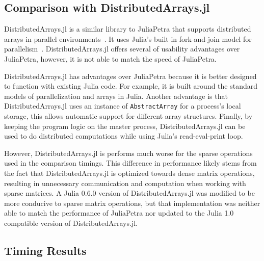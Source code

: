 \documentclass[acmsmall]{acmart}
\newcommand{\snippet}[1]{\lstinline[mathescape]{#1}}
\begin{document}
	\subsection{Comparison with DistributedArrays.jl}
	
	DistributedArrays.jl is a similar library to JuliaPetra that supports
	distributed arrays in parallel environments~\cite{Github:DA}.
	It uses Julia's built in fork-and-join model for parallelism~\cite{Bezanson:2017:FreshApproach}.
	DistributedArrays.jl offers several of usability advantages over JuliaPetra, however, it is not able to match the speed of JuliaPetra.
	
	DistributedArrays.jl has advantages over JuliaPetra because it is better designed to function with
	existing Julia code.
	For example, it is built around the standard models of parallelization and arrays in Julia.
	Another advantage is that DistributedArrays.jl uses an instance of \snippet{AbstractArray}
	for a process's local storage, this allows automatic support for different array structures.
	Finally, by keeping the program logic on the master process, DistributedArrays.jl can be used to
	do distributed computations while using Julia's read-eval-print loop.
	
	However, DistributedArrays.jl is performs much worse for the sparse operations used in the comparison timings.
	This difference in performance likely stems from the fact that DistributedArrays.jl is optimized towards dense matrix operations, resulting in unnecessary communication and computation when working with sparse matrices.
	A Julia 0.6.0 version of DistributedArrays.jl was modified to be more conducive to sparse matrix operations, but that implementation was neither able to match the performance of JuliaPetra nor updated to the Julia 1.0 compatible version of DistributedArrays.jl.
	
	\subsection{Timing Results}
	
\end{document}
